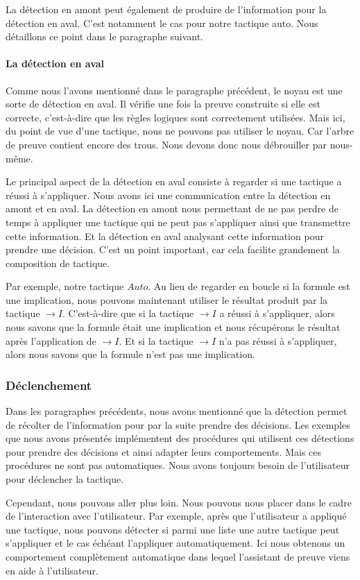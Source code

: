\documentclass[titlepage,draft]{article}
\begin{document}
La détection en amont peut également de produire de l'information pour la détection en aval. C'est notamment le cas pour notre tactique auto. Nous détaillons ce point dans le paragraphe suivant.

\paragraph{La détection en aval}
Comme nous l'avons mentionné dans le paragraphe précédent, le noyau est une sorte de détection en aval. Il vérifie une fois la preuve construite si elle est correcte, c'est-à-dire que les règles logiques sont correctement utilisées. Mais ici, du point de vue d'une tactique, nous ne pouvons pas utiliser le noyau. Car l'arbre de preuve contient encore des trous. Nous devons donc nous débrouiller par nous-même.

Le principal aspect de la détection en aval consiste à regarder si une tactique a réussi à s'appliquer. Nous avons ici une communication entre la détection en amont et en aval. La détection en amont nous permettant de ne pas perdre de temps à appliquer une tactique qui ne peut pas s'appliquer ainsi que transmettre cette information. Et la détection en aval analysant cette information pour prendre une décision. C'est un point important, car cela facilite grandement la composition de tactique.

Par exemple, notre tactique $Auto$. Au lieu de regarder en boucle si la formule est une implication, nous pouvons maintenant utiliser le résultat produit par la tactique $\to I$. C'est-à-dire que si la tactique $\to I$ a réussi à s'appliquer, alors nous savons que la formule était une implication et nous récupérons le résultat après l'application de $\to I$. Et si la tactique $\to I$ n'a pas réussi à s'appliquer, alors nous savons que la formule n'est pas une implication.

\subsubsection{Déclenchement}
Dans les paragraphes précédents, nous avons mentionné que la détection permet de récolter de l'information pour par la suite prendre des décisions. Les exemples que nous avons présentés implémentent des procédures qui utilisent ces détections pour prendre des décisions et ainsi adapter leurs comportements. Mais ces procédures ne sont pas automatiques. Nous avons toujours besoin de l'utilisateur pour déclencher la tactique.

Cependant, nous pouvons aller plus loin. Nous pouvons nous placer dans le cadre de l'interaction avec l'utilisateur. Par exemple, après que l'utilisateur a appliqué une tactique, nous pouvons détecter si parmi une liste une autre tactique peut s'appliquer et le cas échéant l'appliquer automatiquement. Ici nous obtenons un comportement complètement automatique dans lequel l'assistant de preuve viens en aide à l'utilisateur.
\end{document}
